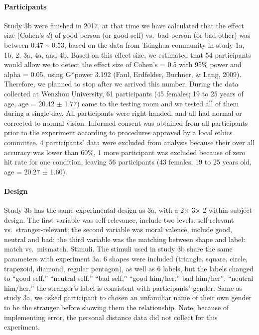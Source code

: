 \documentclass[
  english,
  man]{apa6}
\let\oldparagraph\paragraph
\renewcommand{\paragraph}[1]{\oldparagraph{#1}\mbox{}}
\begin{document}
\hypertarget{participants-6}{%
\paragraph{Participants}\label{participants-6}}

Study 3b were finished in 2017, at that time we have calculated that the effect size (Cohen's \(d\)) of good-person (or good-self) vs.~bad-person (or bad-other) was between 0.47 \textasciitilde{} 0.53, based on the data from Tsinghua community in study 1a, 1b, 2, 3a, 4a, and 4b. Based on this effect size, we estimated that 54 participants would allow we to detect the effect size of Cohen's = 0.5 with 95\% power and alpha = 0.05, using G*power 3.192 (Faul, Erdfelder, Buchner, \& Lang, 2009). Therefore, we planned to stop after we arrived this number. During the data collected at Wenzhou University, 61 participants (45 females; 19 to 25 years of age, age = 20.42 \(\pm\) 1.77) came to the testing room and we tested all of them during a single day. All participants were right-handed, and all had normal or corrected-to-normal vision. Informed consent was obtained from all participants prior to the experiment according to procedures approved by a local ethics committee. 4 participants' data were excluded from analysis because their over all accuracy was lower than 60\%, 1 more participant was excluded because of zero hit rate for one condition, leaving 56 participants (43 females; 19 to 25 years old, age = 20.27 \(\pm\) 1.60).

\hypertarget{design-1}{%
\paragraph{Design}\label{design-1}}

Study 3b has the same experimental design as 3a, with a 2× 3× 2 within-subject design. The first variable was self-relevance, include two levels: self-relevant vs.~stranger-relevant; the second variable was moral valence, include good, neutral and bad; the third variable was the matching between shape and label: match vs.~mismatch.
Stimuli. The stimuli used in study 3b share the same parameters with experiment 3a. 6 shapes were included (triangle, square, circle, trapezoid, diamond, regular pentagon), as well as 6 labels, but the labels changed to ``good self,'' ``neutral self,'' ``bad self,'' ``good him/her,'' bad him/her'', ``neutral him/her,'' the stranger's label is consistent with participants' gender. Same as study 3a, we asked participant to chosen an unfamiliar name of their own gender to be the stranger before showing them the relationship. Note, because of implementing error, the personal distance data did not collect for this experiment.
\end{document}
